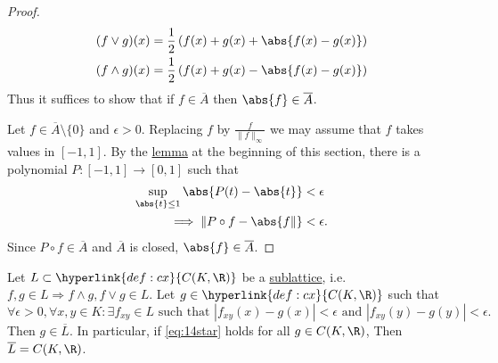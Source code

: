 \documentclass{article}
\begin{document}
\begin{proof}
    \begin{align*}
        (f \vee g)(x) &= \frac{1}{2}\left(f(x) + g(x) + \abs{f(x) - g(x)}\right) \\
        (f \wedge g)(x) &= \frac{1}{2}\left(f(x) + g(x) - \abs{f(x) - g(x)}\right)
    \end{align*}
    Thus it suffices to show that if $f \in \overline{A}$ then $\abs{f} \in \overline{A}$.

    Let $f \in \overline{A} \setminus \{0\}$ and $\epsilon > 0$.
    Replacing $f$ by $\frac{f}{\|f\|_\infty}$ we may assume that $f$ takes values in $[-1, 1]$.
    By the \hyperlink{lem:abs}{lemma} at the beginning of this section, there is a polynomial $P: [-1, 1] \to [0, 1]$ such that
    \begin{align*}
        \sup_{\abs{t} \leq 1} \abs{P(t) - \abs{t}} &< \epsilon \\
        \implies \|P \circ f - \abs{f\|} &< \epsilon.
    \end{align*}
    Since $P \circ f \in \overline{A}$ and $\overline{A}$ is closed, $\abs{f} \in \overline{A}$.
\end{proof}


\begin{lemma}
    Let $L \subset \hyperlink{def:cx}{C(K, \R)}$ be a \hyperlink{def:lattice}{sublattice}, i.e. $f,g \in L \Longrightarrow f \wedge g, f \vee g \in L$.
    Let $g \in \hyperlink{def:cx}{C(K, \R)}$ such that
    \begin{equation*}
        \forall\epsilon>0,\forall x,y\in K:\exists f_{xy}\in L\text{ such that }|f_{xy}(x)-g(x)|<\epsilon\text{ and }|f_{xy}(y)-g(y)|<\epsilon. \label{eq:14star} \tag{$*$}
    \end{equation*}
    Then $g \in \overline{L}$. In particular, if \eqref{eq:14star} holds for all $g \in C(K, \R)$, Then $\overline{L} = C(K, \R)$.
\end{lemma}
\end{document}
